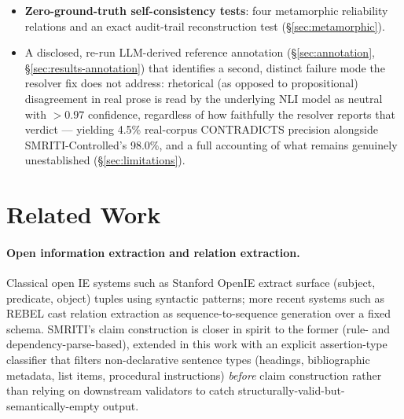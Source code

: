 \documentclass[11pt]{article}
\begin{document}
\begin{itemize}
    resolver fallback branch (\S\ref{sec:system}, \S\ref{sec:bugs}).
  \item \textbf{Zero-ground-truth self-consistency tests}: four metamorphic
    reliability relations and an exact audit-trail reconstruction test
    (\S\ref{sec:metamorphic}).
  \item A disclosed, re-run LLM-derived reference annotation
    (\S\ref{sec:annotation}, \S\ref{sec:results-annotation}) that identifies a
    second, distinct failure mode the resolver fix does not address:
    rhetorical (as opposed to propositional) disagreement in real prose is
    read by the underlying NLI model as neutral with $>0.97$ confidence,
    regardless of how faithfully the resolver reports that verdict ---
    yielding 4.5\% real-corpus CONTRADICTS precision alongside
    SMRITI-Controlled's 98.0\%, and a full accounting of what remains
    genuinely unestablished (\S\ref{sec:limitations}).
\end{itemize}

\section{Related Work}
\label{sec:related}

\paragraph{Open information extraction and relation extraction.} Classical
open IE systems such as Stanford OpenIE \citep{angeli2015leveraging}
extract surface (subject, predicate, object) tuples using syntactic
patterns; more recent systems such as REBEL \citep{cabot2021rebel} cast
relation extraction as sequence-to-sequence generation over a fixed
schema. SMRITI's claim construction is closer in spirit to the former
(rule- and dependency-parse-based), extended in this work with an explicit
assertion-type classifier that filters non-declarative sentence types
(headings, bibliographic metadata, list items, procedural instructions)
\emph{before} claim construction rather than relying on downstream
validators to catch structurally-valid-but-semantically-empty output.
\end{document}
